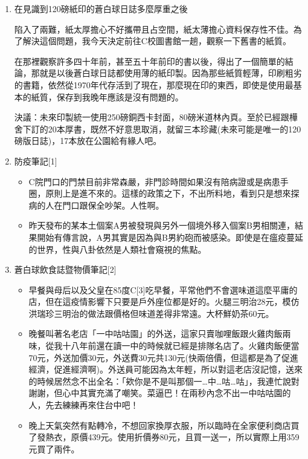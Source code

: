 \documentclass[a5paper, 11pt
]{book}
\begin{document}
\begin{enumerate}
\def\labelenumi{\arabic{enumi}.}
\item
  在見識到120磅紙印的蒼白球日誌多麼厚重之後

  陷入了兩難，紙太厚擔心不好攜帶且占空間，紙太薄擔心資料保存性不佳。為了解決這個問題，我今天決定前往C校圖書館一趟，觀察一下舊書的紙質。

  在那裡觀察許多四十年前，甚至五十年前印的書以後，得出了一個簡單的結論，那就是以後蒼白球日誌都使用薄的紙印製。因為那些紙質輕薄，印刷粗劣的書籍，依然從1970年代存活到了現在，那麼現在印的東西，即使是使用最基本的紙質，保存到我晚年應該是沒有問題的。

  決議：未來印製統一使用250磅銅西卡封面，80磅米道林內頁。至於已經跟樺舍下訂的20本厚書，既然不好意思取消，就留三本珍藏(未來可能是唯一的120磅版日誌)，17本放在公園給有緣人吧。
\item
  防疫筆記{[}1{]}

  \begin{itemize}
  \item
    C院門口的門禁目前非常森嚴，非門診時間如果沒有陪病證或是病患手圈，原則上是進不來的。這樣的政策之下，不出所料地，看到只是想來探病的人在門口跟保全吵架。人性啊。
  \item
    昨天發布的某本土個案A男被發現與另外一個境外移入個案B男相關連，結果開始有傳言說，A男其實是因為與B男約砲而被感染。即使是在瘟疫蔓延的世界，性與八卦依然是人類社會窺視的焦點。
  \end{itemize}
\item
  蒼白球飲食誌暨物價筆記{[}2{]}

  \begin{itemize}
  \item
    早餐與母后以及父皇在85度C{[}3{]}吃早餐，平常他們不會選味道這麼平庸的店，但在這疫情影響下只要是戶外座位都是好的。火腿三明治28元，模仿洪瑞珍三明治的做法跟價格但味道差得非常遠。大杯鮮奶茶60元。
  \item
    晚餐叫著名老店「一中咕咕園」的外送，這家只賣咖哩飯跟火雞肉飯兩味，從我十八年前還在讀一中的時候就已經是排隊名店了。火雞肉飯便當70元，外送加價30元，外送費30元共130元(快兩倍價，但這都是為了促進經濟，促進經濟啊)。外送員可能因為太年輕，所以對這老店沒記憶，送來的時候居然念不出全名：「欸你是不是叫那個一\ldots 中\ldots 咕\ldots 咕」，我連忙說對謝謝，但心中其實充滿了嘲笑。菜逼巴！在兩秒內念不出一中咕咕園的人，先去練練再來住台中吧！
  \item
    晚上天氣突然有點轉冷，不想回家換厚衣服，所以臨時在全家便利商店買了發熱衣，原價439元。使用折價券80元，且買一送一，所以實際上用359元買了兩件。
  \end{itemize}
\end{enumerate}
\end{document}
